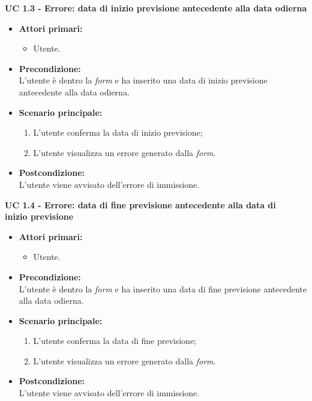 \noindent \textbf{\large UC 1.3 - Errore: data di inizio previsione antecedente alla data odierna}
\label{uc:err-inserimento-data-inizio-prev}
\begin{itemize}

	\item \textbf{Attori primari: }
		\begin{itemize}
			\item Utente.
		\end{itemize}

	\item \textbf{Precondizione: }\\[0.3cm]
		L'utente è dentro la \textit{form} e ha inserito una data di inizio previsione antecedente
		alla data odierna.

	\item \textbf{Scenario principale: }
		\begin{enumerate}
			\item L'utente conferma la data di inizio previsione;
			\item L'utente visualizza un errore generato dalla \textit{form}.
		\end{enumerate}
		

	\item \textbf{Postcondizione: }\\[0.3cm]
		L'utente viene avvisato dell'errore di immissione.

\end{itemize}

\vspace{0.4cm}

\noindent \textbf{\large UC 1.4 - Errore: data di fine previsione antecedente alla data di \\\hspace*{56pt}inizio previsione}
\label{uc:err-inserimento-data-fine-prev}
\begin{itemize}

	\item \textbf{Attori primari: }
		\begin{itemize}
			\item Utente.
		\end{itemize}

	\item \textbf{Precondizione: }\\[0.3cm]
		L'utente è dentro la \textit{form} e ha inserito una data di fine previsione antecedente
		alla data odierna.

	\item \textbf{Scenario principale: }
		\begin{enumerate}
			\item L'utente conferma la data di fine previsione;
			\item L'utente visualizza un errore generato dalla \textit{form}.
		\end{enumerate}
		

	\item \textbf{Postcondizione: }\\[0.3cm]
		L'utente viene avvisato dell'errore di immissione.

\end{itemize}

